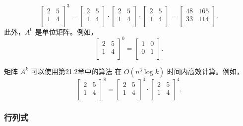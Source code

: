 \[
 \begin{bmatrix}
  2 & 5 \\
  1 & 4 \\
 \end{bmatrix}^3 =
 \begin{bmatrix}
  2 & 5 \\
  1 & 4 \\
 \end{bmatrix} \cdot
 \begin{bmatrix}
  2 & 5 \\
  1 & 4 \\
 \end{bmatrix} \cdot
 \begin{bmatrix}
  2 & 5 \\
  1 & 4 \\
 \end{bmatrix} =
 \begin{bmatrix}
  48 & 165 \\
  33 & 114 \\
 \end{bmatrix}.
\]
此外，$A^0$ 是单位矩阵。例如，
\[
 \begin{bmatrix}
  2 & 5 \\
  1 & 4 \\
 \end{bmatrix}^0 =
 \begin{bmatrix}
  1 & 0 \\
  0 & 1 \\
 \end{bmatrix}.
\]

矩阵 $A^k$ 可以使用第21.2章中的算法
在 $O(n^3 \log k)$ 时间内高效计算。例如，
\[
 \begin{bmatrix}
  2 & 5 \\
  1 & 4 \\
 \end{bmatrix}^8 =
 \begin{bmatrix}
  2 & 5 \\
  1 & 4 \\
 \end{bmatrix}^4 \cdot
 \begin{bmatrix}
  2 & 5 \\
  1 & 4 \\
 \end{bmatrix}^4.
\]

\subsubsection{行列式}


